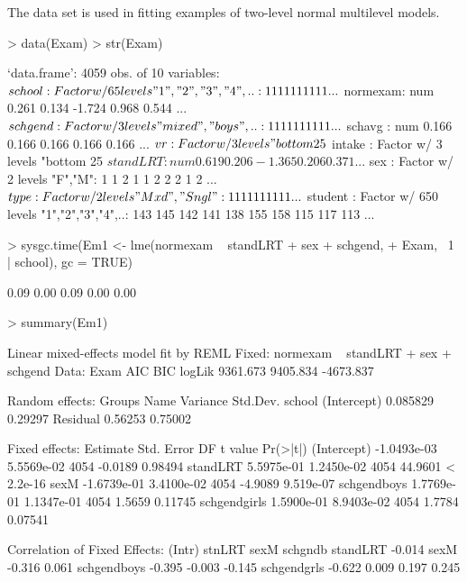 \documentclass[12pt]{article}
\begin{document}
The  data set is used in fitting examples of two-level
normal multilevel models.
\begin{Schunk}
\begin{Sinput}
> data(Exam)
> str(Exam)
\end{Sinput}
\begin{Soutput}
`data.frame':	4059 obs. of  10 variables:
 $ school  : Factor w/ 65 levels "1","2","3","4",..: 1 1 1 1 1 1 1 1 1 1 ...
 $ normexam: num   0.261  0.134 -1.724  0.968  0.544 ...
 $ schgend : Factor w/ 3 levels "mixed","boys",..: 1 1 1 1 1 1 1 1 1 1 ...
 $ schavg  : num  0.166 0.166 0.166 0.166 0.166 ...
 $ vr      : Factor w/ 3 levels "bottom 25%","mi..",..: 2 2 2 2 2 2 2 2 2 2 ...
 $ intake  : Factor w/ 3 levels "bottom 25%","mi..",..: 1 2 3 2 2 1 3 2 2 3 ...
 $ standLRT: num   0.619  0.206 -1.365  0.206  0.371 ...
 $ sex     : Factor w/ 2 levels "F","M": 1 1 2 1 1 2 2 2 1 2 ...
 $ type    : Factor w/ 2 levels "Mxd","Sngl": 1 1 1 1 1 1 1 1 1 1 ...
 $ student : Factor w/ 650 levels "1","2","3","4",..: 143 145 142 141 138 155 158 115 117 113 ...
\end{Soutput}
\begin{Sinput}
> sysgc.time(Em1 <- lme(normexam ~ standLRT + sex + schgend, 
+     Exam, ~1 | school), gc = TRUE)
\end{Sinput}
\begin{Soutput}
[1] 0.09 0.00 0.09 0.00 0.00
\end{Soutput}
\begin{Sinput}
> summary(Em1)
\end{Sinput}
\begin{Soutput}
Linear mixed-effects model fit by REML
Fixed: normexam ~ standLRT + sex + schgend 
 Data: Exam 
      AIC      BIC    logLik
 9361.673 9405.834 -4673.837

Random effects:
 Groups   Name        Variance Std.Dev.
 school   (Intercept) 0.085829 0.29297 
 Residual             0.56253  0.75002 

Fixed effects:
                Estimate  Std. Error   DF t value  Pr(>|t|)
(Intercept)  -1.0493e-03  5.5569e-02 4054 -0.0189   0.98494
standLRT      5.5975e-01  1.2450e-02 4054 44.9601 < 2.2e-16
sexM         -1.6739e-01  3.4100e-02 4054 -4.9089 9.519e-07
schgendboys   1.7769e-01  1.1347e-01 4054  1.5659   0.11745
schgendgirls  1.5900e-01  8.9403e-02 4054  1.7784   0.07541

Correlation of Fixed Effects:
            (Intr) stnLRT sexM   schgndb
standLRT    -0.014                      
sexM        -0.316  0.061               
schgendboys -0.395 -0.003 -0.145        
schgendgrls -0.622  0.009  0.197  0.245 


\end{Soutput}
\end{Schunk}
\end{document}
